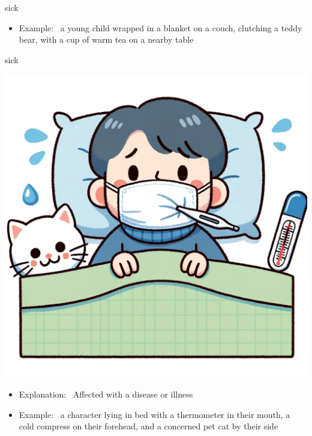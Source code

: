 \documentclass[avery5371, grid,frame]{flashcards}
\begin{document}
\begin{flashcard}{sick}
\begin{center}
\begin{minipage}[c]{.45\textwidth}
\begin{itemize}
            \item Example: \ a young child wrapped in a blanket on a couch, clutching a teddy bear, with a cup of warm tea on a nearby table
            \end{itemize}
        \end{minipage}
    \end{center}
    \vspace*{\fill}
\end{flashcard}\begin{flashcard}{sick}
    \vspace*{\fill}
    \begin{center}
        \begin{minipage}[c]{.45\textwidth}
            \includegraphics[width=\textwidth]{cards/s/sick/sick - a character lying in bed with a thermometer in their mouth, a cold compress on their forehead, and a concerned pet cat by their side.png}
        \end{minipage}
        \begin{minipage}[c]{.45\textwidth}
            \begin{itemize}\setlength\itemsep{12pt}
            \item Explanation: \ Affected with a disease or illness

            \item Example: \ a character lying in bed with a thermometer in their mouth, a cold compress on their forehead, and a concerned pet cat by their side
            \end{itemize}
        \end{minipage}
    \end{center}
    \vspace*{\fill}
\end{flashcard}
\end{document}
